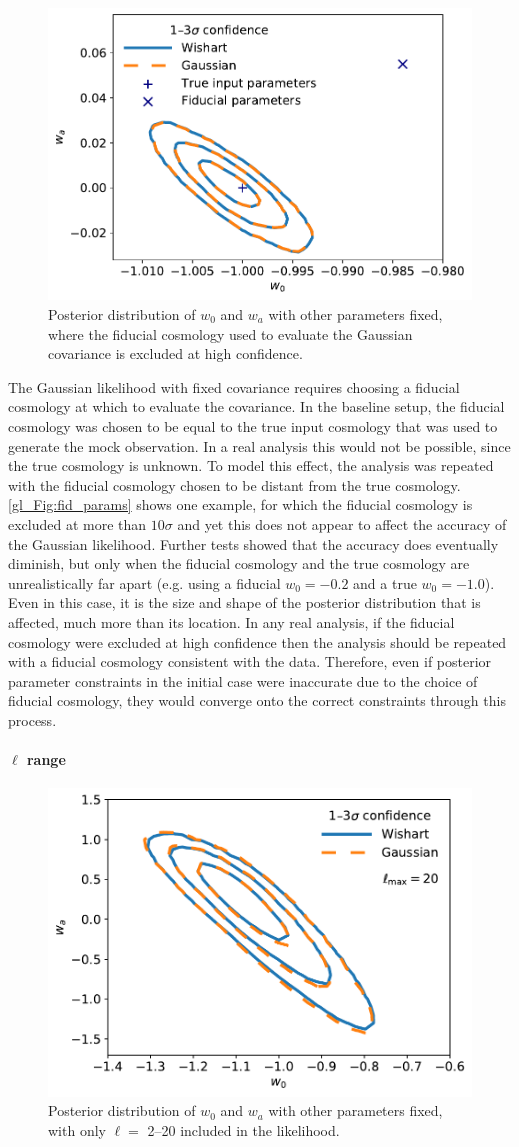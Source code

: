 \begin{figure}
\centering
\includegraphics[width=.5\textwidth]{fid_params}
\caption{Posterior distribution of $w_0$ and $w_a$ with other parameters fixed, where the fiducial cosmology used to evaluate the Gaussian covariance is excluded at high confidence.}
\label{gl_Fig:fid_params}
\end{figure}

The Gaussian likelihood with fixed covariance requires choosing a fiducial cosmology at which to evaluate the covariance. In the baseline setup, the fiducial cosmology was chosen to be equal to the true input cosmology that was used to generate the mock observation. In a real analysis this would not be possible, since the true cosmology is unknown. To model this effect, the analysis was repeated with the fiducial cosmology chosen to be distant from the true cosmology. \autoref{gl_Fig:fid_params} shows one example, for which the fiducial cosmology is excluded at more than $10 \sigma$ and yet this does not appear to affect the accuracy of the Gaussian likelihood. Further tests showed that the accuracy does eventually diminish, but only when the fiducial cosmology and the true cosmology are unrealistically far apart (e.g. using a fiducial $w_0 = -0.2$ and a true $w_0 = -1.0$). Even in this case, it is the size and shape of the posterior distribution that is affected, much more than its location. In any real analysis, if the fiducial cosmology were excluded at high confidence then the analysis should be repeated with a fiducial cosmology consistent with the data. Therefore, even if posterior parameter constraints in the initial case were inaccurate due to the choice of fiducial cosmology, they would converge onto the correct constraints through this process.

\paragraph*{$\bm{\ell}$ range}

\begin{figure}
\centering
\includegraphics[width=.5\textwidth]{lmax20}
\caption{Posterior distribution of $w_0$ and $w_a$ with other parameters fixed, with only $\ell = $ 2--20 included in the likelihood.}
\label{gl_Fig:lmax20}
\end{figure}

